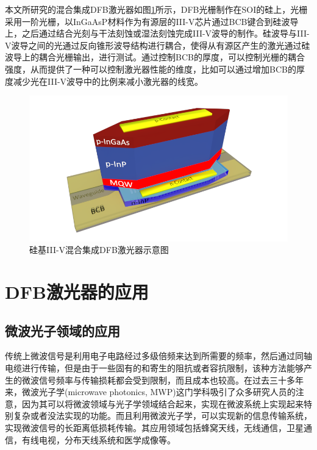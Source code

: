本文所研究的混合集成DFB激光器如图\ref{intro_heterogeneously_dfb_laser}所示，DFB光栅制作在SOI的硅上，光栅采用一阶光栅，以InGaAsP材料作为有源层的III-V芯片通过BCB键合到硅波导上，之后通过结合光刻与干法刻蚀或湿法刻蚀完成III-V波导的制作。硅波导与III-V波导之间的光通过反向锥形波导结构进行耦合，使得从有源区产生的激光通过硅波导上的耦合光栅输出，进行测试。通过控制BCB的厚度，可以控制光栅的耦合强度，从而提供了一种可以控制激光器性能的维度，比如可以通过增加BCB的厚度减少光在III-V波导中的比例来减小激光器的线宽\cite{yariv2016rethinking}。

\begin{figure}[htb]
	\centering
	\includegraphics[width=15cm]{./Pictures/intro_heterogeneously_dfb_laser.png}
	\captionsetup{justification=centering}
	\caption{硅基III-V混合集成DFB激光器示意图}
	\label{intro_heterogeneously_dfb_laser}
\end{figure}

\section{DFB激光器的应用}

\subsection{微波光子领域的应用}

传统上微波信号是利用电子电路经过多级倍频来达到所需要的频率，然后通过同轴电缆进行传输，但是由于一些固有的和寄生的阻抗或者容抗限制，该种方法能够产生的微波信号频率与传输损耗都会受到限制，而且成本也较高。在过去三十多年来，微波光子学(microwave photonics, MWP)这门学科吸引了众多研究人员的注意，因为其可以将微波领域与光子学领域结合起来，实现在微波系统上实现起来特别复杂或者没法实现的功能。而且利用微波光子学，可以实现新的信息传输系统，实现微波信号的长距离低损耗传输\cite{capmany2007microwave,seeds2002microwave,seeds2006microwave,yao2009microwave}。其应用领域包括蜂窝天线，无线通信，卫星通信，有线电视，分布天线系统和医学成像等。

